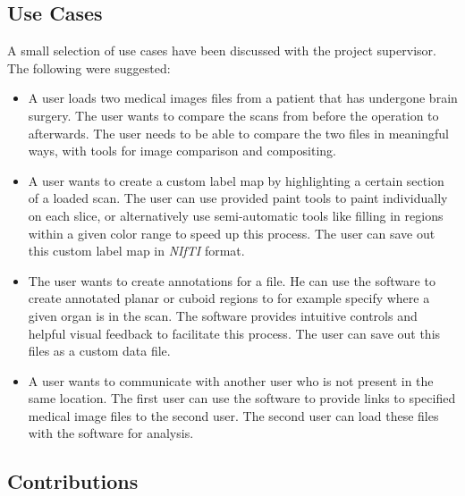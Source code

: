 \documentclass[a4paper,11pt,twoside]{article}
\begin{document}
\subsection{Use Cases}

A small selection of use cases have been discussed with the project supervisor. The following were suggested:

\begin{itemize}

\item A user loads two medical images files from a patient that has undergone brain surgery. The user wants to compare the scans from before the operation to afterwards. The user needs to be able to compare the two files in meaningful ways, with tools for image comparison and compositing.

\item A user wants to create a custom label map by highlighting a certain section of a loaded scan. The user can use provided paint tools to paint individually on each slice, or alternatively use semi-automatic tools like filling in regions within a given color range to speed up this process. The user can save out this custom label map in \textit{NIfTI} format.

\item The user wants to create annotations for a file. He can use the software to create annotated planar or cuboid regions to for example specify where a given organ is in the scan. The software provides intuitive controls and helpful visual feedback to facilitate this process. The user can save out this files as a custom data file.

\item A user wants to communicate with another user who is not present in the same location. The first user can use the software to provide links to specified medical image files to the second user. The second user can load these files with the software for analysis.

\end{itemize}







\subsection{Contributions}
\end{document}

